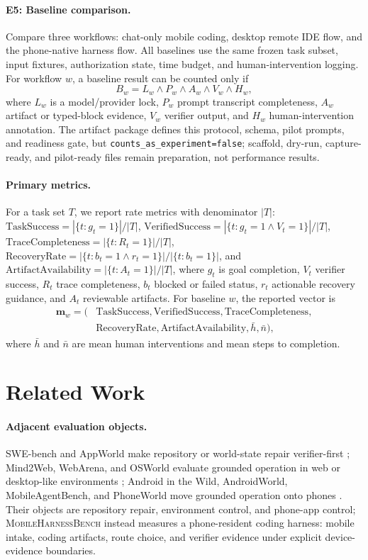 \documentclass{article}
\newcommand{\mhb}{\textsc{MobileHarnessBench}}
\begin{document}
\paragraph{E5: Baseline comparison.}
Compare three workflows: chat-only mobile coding, desktop remote IDE flow, and the phone-native harness flow.
All baselines use the same frozen task subset, input fixtures, authorization state, time budget, and human-intervention logging.
For workflow \(w\), a baseline result can be counted only if
\[
B_w=L_w\land P_w\land A_w\land V_w\land H_w,
\]
where \(L_w\) is a model/provider lock, \(P_w\) prompt transcript completeness, \(A_w\) artifact or typed-block evidence, \(V_w\) verifier output, and \(H_w\) human-intervention annotation.
The artifact package defines this protocol, schema, pilot prompts, and readiness gate, but \texttt{counts\_as\_experiment=false}; scaffold, dry-run, capture-ready, and pilot-ready files remain preparation, not performance results.

\paragraph{Primary metrics.}
For a task set \(T\), we report rate metrics with denominator \(|T|\):
\(\mathrm{TaskSuccess}=|{\{t:g_t=1\}}|/|T|\),
\(\mathrm{VerifiedSuccess}=|{\{t:g_t=1 \land V_t=1\}}|/|T|\),
\(\mathrm{TraceCompleteness}=|{\{t:R_t=1\}}|/|T|\),
\(\mathrm{RecoveryRate}=|{\{t:b_t=1 \land r_t=1\}}|/|\{t:b_t=1\}|\), and
\(\mathrm{ArtifactAvailability}=|{\{t:A_t=1\}}|/|T|\), where \(g_t\) is goal completion, \(V_t\) verifier success, \(R_t\) trace completeness, \(b_t\) blocked or failed status, \(r_t\) actionable recovery guidance, and \(A_t\) reviewable artifacts.
For baseline \(w\), the reported vector is
\[
\begin{aligned}
\mathbf{m}_w=(&\mathrm{TaskSuccess},\mathrm{VerifiedSuccess},\mathrm{TraceCompleteness},\\
&\mathrm{RecoveryRate},\mathrm{ArtifactAvailability},\bar h,\bar n),
\end{aligned}
\]
where \(\bar h\) and \(\bar n\) are mean human interventions and mean steps to completion.

\section{Related Work}

\paragraph{Adjacent evaluation objects.}
SWE-bench and AppWorld make repository or world-state repair verifier-first \citep{swebench, appworld}; Mind2Web, WebArena, and OSWorld evaluate grounded operation in web or desktop-like environments \citep{mind2web, webarena, osworld}; Android in the Wild, AndroidWorld, MobileAgentBench, and PhoneWorld move grounded operation onto phones \citep{aitw, androidworld, mobileagentbench, phoneworld}.
Their objects are repository repair, environment control, and phone-app control; \mhb{} instead measures a phone-resident coding harness: mobile intake, coding artifacts, route choice, and verifier evidence under explicit device-evidence boundaries.
\end{document}
